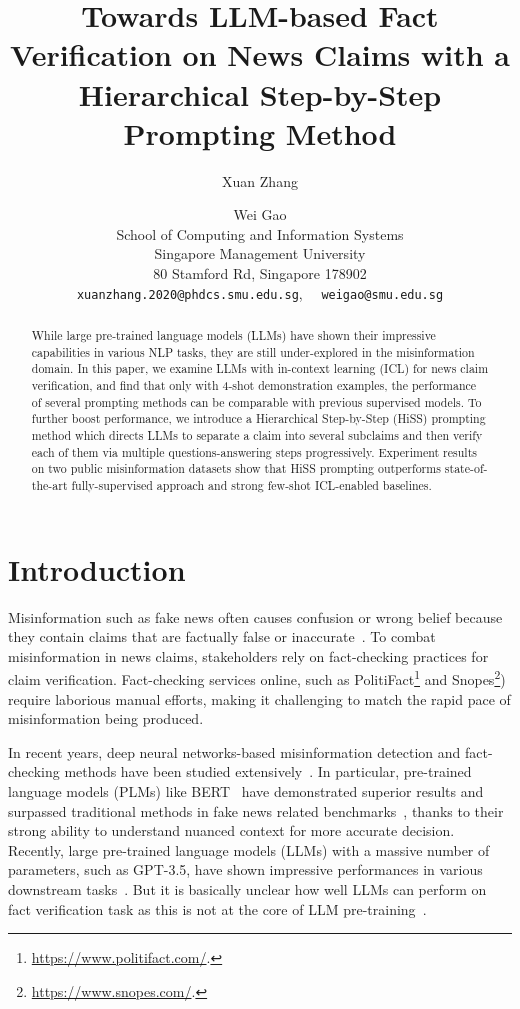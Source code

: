 \documentclass[11pt]{article}
\title{Towards LLM-based Fact Verification on News Claims with a Hierarchical Step-by-Step Prompting Method}
\author{Xuan Zhang \and Wei Gao \\
School of Computing and Information Systems \\ 
Singapore Management University \\
80 Stamford Rd, Singapore 178902 \\
\texttt{xuanzhang.2020@phdcs.smu.edu.sg},~~ \texttt{weigao@smu.edu.sg} }
\begin{document}
\maketitle
\begin{abstract}
While large pre-trained language models (LLMs) have shown their impressive capabilities in various NLP tasks, they are still under-explored in the misinformation domain. In this paper, we examine LLMs with in-context learning (ICL) for news claim verification, and find that only with 4-shot demonstration examples, the performance of several prompting methods can be comparable with previous supervised models. To further boost performance, we introduce a Hierarchical Step-by-Step (HiSS) prompting method which directs LLMs to separate a claim into several subclaims and then verify each of them via multiple questions-answering steps progressively.
Experiment results on two public misinformation datasets show that HiSS prompting outperforms state-of-the-art fully-supervised approach and strong few-shot ICL-enabled baselines.
\end{abstract}

\section{Introduction}
\label{sec:intro}
Misinformation such as fake news often causes confusion or wrong belief because they contain claims that are factually false or inaccurate~\cite{lazer2018science}. 
To combat misinformation in news claims, stakeholders rely on fact-checking practices for claim verification. Fact-checking services online, such as PolitiFact\footnote{\url{https://www.politifact.com/}.} and Snopes\footnote{\url{https://www.snopes.com/}.}) require laborious manual efforts, making it challenging to match the rapid pace of misinformation being produced.

In recent years, deep neural networks-based misinformation detection and fact-checking methods have been studied extensively~\cite{wang2017liar,rashkin2017truth,popat2018declare,ma2019sentence,kotonya2020explainable,atanasova2020generating,yang2022coarse}.
In particular, pre-trained language models (PLMs) like BERT~\cite{kenton2019bert}
have demonstrated superior results and surpassed traditional methods in fake news related benchmarks~\cite{soleimani2020bert,atanasova2020generating,kruengkrai2021multi}, thanks to their strong ability to understand nuanced context for more accurate decision.
Recently, large pre-trained language models (LLMs) with a massive number of parameters, such as GPT-3.5, have shown impressive performances in various downstream tasks~\cite{brown2020language,wei2022chain,zhou2022least,press2022measuring}. But it is basically unclear how well LLMs can perform on fact verification task as this is not at the core of LLM pre-training~\cite{brown2020language,anil2023palm}.
\end{document}
